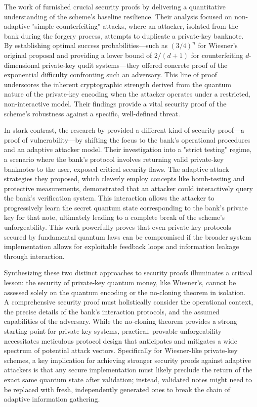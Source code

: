 \documentclass{article} %
\begin{document}
The work of \citet{Molina2012Optimal} furnished crucial security proofs by delivering a quantitative understanding of the scheme's baseline resilience. Their analysis focused on non-adaptive "simple counterfeiting" attacks, where an attacker, isolated from the bank during the forgery process, attempts to duplicate a private-key banknote. By establishing optimal success probabilities—such as $(3/4)^n$ for Wiesner's original proposal and providing a lower bound of $2/(d+1)$ for counterfeiting $d$-dimensional private-key qudit systems—they offered concrete proof of the exponential difficulty confronting such an adversary. This line of proof underscores the inherent cryptographic strength derived from the quantum nature of the private-key encoding when the attacker operates under a restricted, non-interactive model. Their findings provide a vital security proof of the scheme's robustness against a specific, well-defined threat.

In stark contrast, the research by \citet{Nagaj2016Adaptive} provided a different kind of security proof—a proof of vulnerability—by shifting the focus to the bank's operational procedures and an adaptive attacker model. Their investigation into a "strict testing" regime, a scenario where the bank's protocol involves returning valid private-key banknotes to the user, exposed critical security flaws. The adaptive attack strategies they proposed, which cleverly employ concepts like bomb-testing and protective measurements, demonstrated that an attacker could interactively query the bank's verification system. This interaction allows the attacker to progressively learn the secret quantum state corresponding to the bank's private key for that note, ultimately leading to a complete break of the scheme's unforgeability. This work powerfully proves that even private-key protocols secured by fundamental quantum laws can be compromised if the broader system implementation allows for exploitable feedback loops and information leakage through interaction.

Synthesizing these two distinct approaches to security proofs illuminates a critical lesson: the security of private-key quantum money, like Wiesner's, cannot be assessed solely on the quantum encoding or the no-cloning theorem in isolation. A comprehensive security proof must holistically consider the operational context, the precise details of the bank's interaction protocols, and the assumed capabilities of the adversary. While the no-cloning theorem provides a strong starting point for private-key systems, practical, provable unforgeability necessitates meticulous protocol design that anticipates and mitigates a wide spectrum of potential attack vectors. Specifically for Wiesner-like private-key schemes, a key implication for achieving stronger security proofs against adaptive attackers is that any secure implementation must likely preclude the return of the exact same quantum state after validation; instead, validated notes might need to be replaced with fresh, independently generated ones to break the chain of adaptive information gathering.
\end{document}
